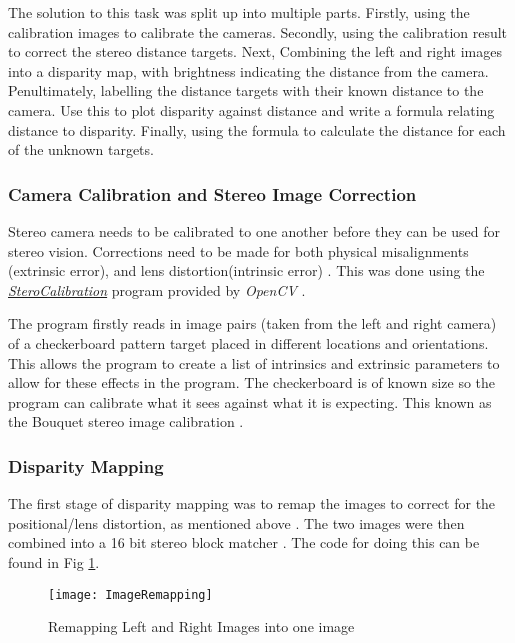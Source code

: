 \documentclass[conference]{IEEEtran}
\begin{document}
The solution to this task was split up into multiple parts. Firstly, using the calibration images to calibrate the cameras. Secondly, using the calibration result to correct the stereo distance targets. Next, Combining the left and right images into a disparity map, with brightness indicating the distance from the camera. Penultimately, labelling the distance targets with their known distance to the camera. Use this to plot disparity against distance and write a formula relating distance to disparity. Finally, using the formula to calculate the distance for each of the unknown targets.

\subsubsection{Camera Calibration and Stereo Image Correction}

Stereo camera needs to be calibrated to one another before they can be used for stereo vision. Corrections need to be made for both physical misalignments (extrinsic error), and lens distortion(intrinsic error) \cite{Stero_Calibration}. This was done using the \href{https://docs.opencv.org/2.4/modules/calib3d/doc/camera_calibration_and_3d_reconstruction.html?highlight=stereocalibration}\textit{SteroCalibration} program provided by \textit{OpenCV} \cite{Book_Calibration}.

The program firstly reads in image pairs (taken from the left and right camera) of a checkerboard pattern target placed in different locations and orientations. This allows the program to create a list of intrinsics and extrinsic parameters to allow for these effects in the program. The checkerboard is of known size so the program can calibrate what it sees against what it is expecting. This known as the Bouquet stereo image calibration \cite{Bouget}.

\subsubsection{Disparity Mapping} \label{Disparity_Mapping}

The first stage of disparity mapping was to remap the images to correct for the positional/lens distortion, as mentioned above \cite{OpenCV_Remapping}. The two images were then combined into a 16 bit stereo block matcher \cite{Stereo_Block_Matching}. The code for doing this can be found in Fig \ref{fig:ImageRemapping}.

\begin{figure}[H]
\centerline{\texttt{[image: ImageRemapping]}}
\caption{Remapping Left and Right Images into one image}
\label{fig:ImageRemapping}
\end{figure}
\end{document}
